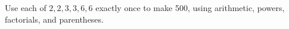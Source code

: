 Use each of $2,2,3,3,6,6$ exactly once to make 500, using arithmetic, powers, factorials, and parentheses.
